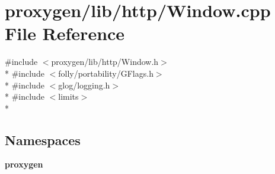 \section{proxygen/lib/http/\+Window.cpp File Reference}
\label{Window_8cpp}
{\ttfamily \#include $<$proxygen/lib/http/\+Window.\+h$>$}\\*
{\ttfamily \#include $<$folly/portability/\+G\+Flags.\+h$>$}\\*
{\ttfamily \#include $<$glog/logging.\+h$>$}\\*
{\ttfamily \#include $<$limits$>$}\\*
\subsection*{Namespaces}
\begin{DoxyCompactItemize}
\item 
 {\bf proxygen}
\end{DoxyCompactItemize}
